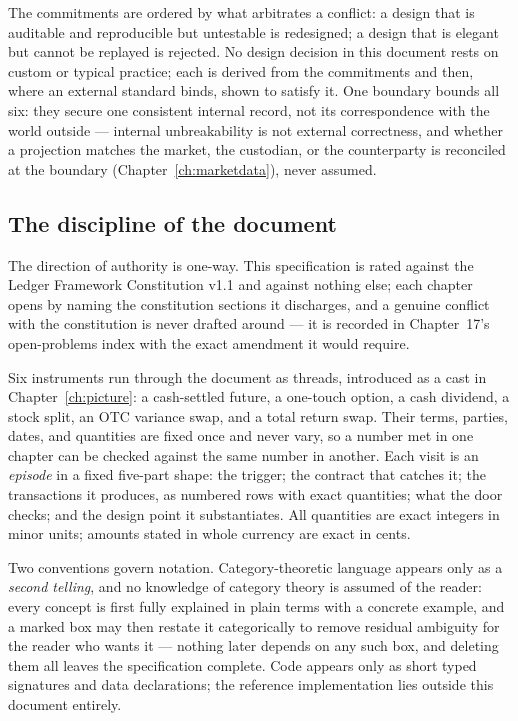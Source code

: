 The commitments are ordered by what arbitrates a conflict: a design that is auditable
and reproducible but untestable is redesigned; a design that is elegant but cannot be
replayed is rejected. No design decision in this document rests on custom or typical
practice; each is derived from the commitments and then, where an external standard
binds, shown to satisfy it. One boundary bounds all six: they secure one consistent
internal record, not its correspondence with the world outside --- internal
unbreakability is not external correctness, and whether a projection matches the market,
the custodian, or the counterparty is reconciled at the boundary
(Chapter~\ref{ch:marketdata}), never assumed.

\subsection{The discipline of the document}

The direction of authority is one-way. This specification is rated against the Ledger
Framework Constitution v1.1 and against nothing else; each chapter opens by naming the
constitution sections it discharges, and a genuine conflict with the constitution is
never drafted around --- it is recorded in Chapter~17's open-problems index with the
exact amendment it would require.

Six instruments run through the document as threads, introduced as a cast in
Chapter~\ref{ch:picture}: a cash-settled future, a one-touch option, a cash dividend,
a stock split, an OTC variance swap, and a total return swap. Their terms, parties,
dates, and quantities are fixed once and never vary, so a number met in one chapter
can be checked against the same number in another. Each visit is an \emph{episode} in
a fixed five-part shape: the trigger; the contract that catches it; the transactions
it produces, as numbered rows with exact quantities; what the door checks; and the
design point it substantiates. All quantities are exact integers in minor units;
amounts stated in whole currency are exact in cents.

Two conventions govern notation. Category-theoretic language appears only as a
\emph{second telling}, and no knowledge of category theory is assumed of the reader:
every concept is first fully explained in plain terms with a concrete example, and a
marked box may then restate it categorically to remove residual ambiguity for the reader
who wants it --- nothing later depends on any such box, and deleting them all
leaves the specification complete. Code appears only as short typed signatures and
data declarations; the reference implementation lies outside this document entirely.
